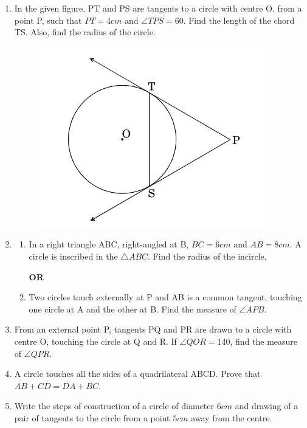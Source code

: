 \documentclass{article}
\begin{document}
\begin{enumerate}
	\item In the given figure, PT and PS are tangents to a circle with centre O, from a point P, such that $PT = 4 cm$ and $\angle TPS = 60$\textdegree. Find the length of the chord TS. Also, find the radius of the circle.
		\begin{figure}[h]
			\centering
			\includegraphics[scale=0.8]{fig3.png}
			\label{fig:my_label}
		\end{figure}
	\item \begin{enumerate}[label=(\alph*)]
			\item In a right triangle ABC, right-angled at B, $BC = 6 cm$ and $AB = 8 cm$. A circle is inscribed in the $\triangle ABC$. Find the radius of the incircle.
			\begin{center}
				\textbf{OR}
			\end{center}
			\item Two circles touch externally at P and AB is a common tangent, touching one circle at A and the other at B. Find the measure of $\angle APB$.
		\end{enumerate}
	\item From an external point P, tangents PQ and PR are drawn to a circle with centre O, touching the circle at Q and R. If $\angle QOR = 140$\textdegree, find the measure of $\angle QPR$.
	\item A circle touches all the sides of a quadrilateral ABCD. Prove that $AB + CD = DA + BC$.
	\item Write the steps of construction of a circle of diameter $6 cm$ and drawing of a pair of tangents to the circle from a point $5 cm$ away from the centre.
\end{enumerate}
\end{document}

